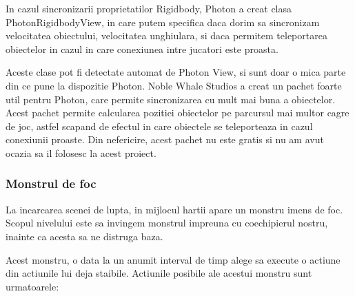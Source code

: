 \documentclass[12pt, a4paper]{article}
\begin{document}
	In cazul sincronizarii proprietatilor Rigidbody, Photon a creat clasa PhotonRigidbodyView, in care putem specifica daca dorim sa sincronizam velocitatea obiectului, velocitatea unghiulara, si daca permitem teleportarea obiectelor in cazul in care conexiunea intre jucatori este proasta.
	\newline
	
	Aceste clase pot fi detectate automat de Photon View, si sunt doar o mica parte din ce pune la dispozitie Photon. Noble Whale Studios a creat un pachet foarte util pentru Photon, care permite sincronizarea cu mult mai buna a obiectelor. Acest pachet permite calcularea pozitiei obiectelor pe parcursul mai multor cagre de joc, astfel scapand de efectul in care obiectele se teleporteaza in cazul conexiunii proaste. Din nefericire, acest pachet nu este gratis si nu am avut ocazia sa il folosesc la acest proiect.
	
	
	
	
	
	\subsubsection{Monstrul de foc}
	\label{section: boss}
	
	La incarcarea scenei de lupta, in mijlocul hartii apare un monstru imens de foc. Scopul nivelului este sa invingem monstrul impreuna cu coechipierul nostru, inainte ca acesta sa ne distruga baza.
	
	Acest monstru, o data la un anumit interval de timp alege sa execute o actiune din actiunile lui deja staibile. Actiunile posibile ale acestui monstru sunt urmatoarele:
	
\end{document}
